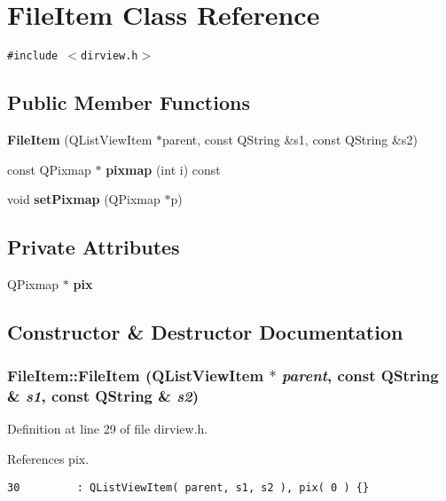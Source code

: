 \section{File\-Item Class Reference}
\label{classFileItem}
{\tt \#include $<$dirview.h$>$}

\subsection*{Public Member Functions}
\begin{CompactItemize}
\item 
{\bf File\-Item} (QList\-View\-Item $\ast$parent, const QString \&s1, const QString \&s2)
\item 
const QPixmap $\ast$ {\bf pixmap} (int i) const 
\item 
void {\bf set\-Pixmap} (QPixmap $\ast$p)
\end{CompactItemize}
\subsection*{Private Attributes}
\begin{CompactItemize}
\item 
QPixmap $\ast$ {\bf pix}
\end{CompactItemize}


\subsection{Constructor \& Destructor Documentation}
\subsubsection{\setlength{\rightskip}{0pt plus 5cm}File\-Item::File\-Item (QList\-View\-Item $\ast$ {\em parent}, const QString \& {\em s1}, const QString \& {\em s2})\hspace{0.3cm}{\tt  [inline]}}\label{classFileItem_FileItema0}




Definition at line 29 of file dirview.h.

References pix.



\footnotesize\begin{verbatim}30         : QListViewItem( parent, s1, s2 ), pix( 0 ) {}
\end{verbatim}\normalsize 


